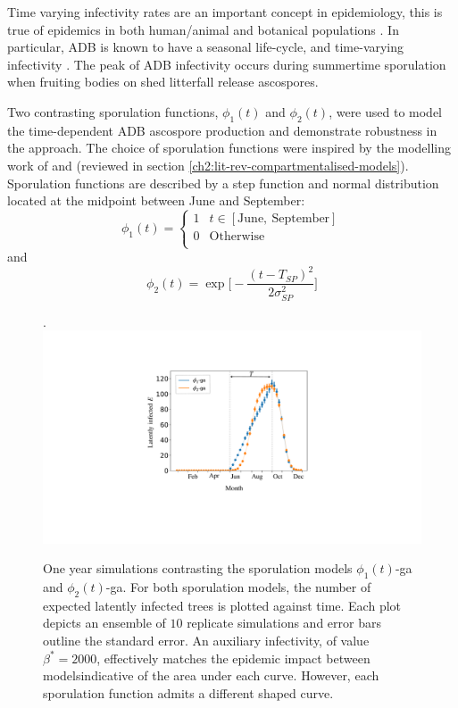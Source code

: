Time varying infectivity rates are an important concept in epidemiology, this is true of epidemics in both human/animal \cite{svensson2007note, liu2012infectious} 
and botanical populations \cite{suffert2018some, leclerc2014estimating, time-varying-infectivity}.
In particular, ADB is known to have a seasonal life-cycle, and time-varying infectivity \cite{grosdidier2018tracking, hietala2013invasive}. 
The peak of ADB infectivity occurs during summertime sporulation when fruiting bodies on shed litterfall release ascospores.

Two contrasting sporulation functions, $\phi_1(t)$ and $\phi_2(t)$, were used to model the time-dependent ADB ascospore production and demonstrate robustness in the approach.
The choice of sporulation functions were inspired by the modelling work of \cite{time-varying-infectivity} and \cite{segarra2001epidemic}
(reviewed in section \ref{ch2:lit-rev-compartmentalised-models}). 
Sporulation functions are described by a step function and normal distribution located at the midpoint between June and September:
\begin{equation}
\phi_1(t)  = \left\{
\begin{array}{ll}
      1 &  t \in [\mathrm{June,\ September}] \\
      0 & \mathrm{Otherwise} \\
\end{array} 
\right.
\end{equation}
and 
\begin{equation}
     \phi_2(t) =  \exp\big[-\frac{(t - T_{SP})^2}{2\sigma_{SP}^2}\big]
\end{equation}

\begin{figure}.
    \centering
    \includegraphics[scale=0.35]{chapter6/figures/fig5-sporulation.pdf}
    \caption{One year simulations contrasting the sporulation models $\phi_1(t)$-ga and $\phi_2(t)$-ga. 
    For both sporulation models, the number of expected latently infected trees is plotted against time. Each plot depicts an ensemble of $10$ replicate simulations and error bars outline the standard error. An auxiliary infectivity, of value $\beta^*=2000$, effectively matches the epidemic impact between models\textemdash indicative of the area under each curve. However, each sporulation function admits a different shaped curve.}
    \label{fig:SEIR-sporulation}
\end{figure}

